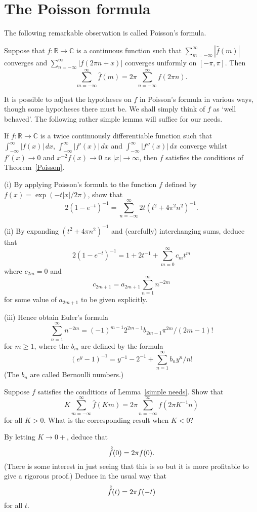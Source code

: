 \section{The Poisson formula}\label{Poisson section}
The following
remarkable observation is called Poisson's formula.
\begin{theorem}\label{Poisson}
Suppose that
$f:{\mathbb R}\rightarrow{\mathbb C}$ is a continuous
function such that $\sum_{m=-\infty}^{\infty}|\hat{f}(m)|$
converges and $\sum_{n=-\infty}^{\infty}|f(2\pi n+x)|$
converges uniformly on $[-\pi,\pi]$. Then
\[\sum_{m=-\infty}^{\infty}\hat{f}(m)=
2\pi\sum_{n=-\infty}^{\infty}f(2\pi n).\]
\end{theorem}

It is possible to adjust the hypotheses on $f$
in Poisson's formula in various ways,
though some hypotheses there must be. We shall simply
think of $f$ as `well behaved'. The following
rather simple lemma will suffice for our needs.
\begin{lemma}\label{simple needs}
If $f:{\mathbb R}\rightarrow{\mathbb C}$
is a twice continuously differentiable function such
that $\int_{-\infty}^{\infty}|f(x)|\,dx$,
$\int_{-\infty}^{\infty}|f'(x)|\,dx$
and $\int_{-\infty}^{\infty}|f''(x)|\,dx$
converge whilst $f'(x)\rightarrow 0$
and $x^{-2}f(x)\rightarrow 0$ as $|x|\rightarrow\infty$,
then $f$ satisfies the conditions of Theorem~\ref{Poisson}.
\end{lemma}

\begin{exercise} (i) By applying Poisson's formula to the function
$f$ defined by $f(x)=\exp(-t|x|/2\pi)$, show that
\[2(1-e^{-t})^{-1}
=\sum_{n=-\infty}^{\infty}2t(t^{2}+4\pi^{2}n^{2})^{-1}.\]

(ii) By expanding $(t^{2}+4\pi n^{2})^{-1}$ and
(carefully) interchanging sums, deduce that
\[2(1-e^{-t})^{-1}=1+2t^{-1}+\sum_{m=0}^{\infty}c_{m}t^{m}\]
where $c_{2m}=0$ and
\[c_{2m+1}=a_{2m+1}\sum_{n=1}^{\infty}n^{-2m}\]
for some value of $a_{2m+1}$ to be given explicitly.

(iii) Hence obtain Euler's formula
\[\sum_{n=1}^{\infty}n^{-2m}=
(-1)^{m-1}2^{2m-1}b_{2m-1}\pi^{2m}/(2m-1)!\]
for $m\geq 1$, where the $b_{m}$ are defined by the formula
\[(e^{y}-1)^{-1}=y^{-1}-2^{-1}+\sum_{n=1}^{\infty}b_{n}y^{n}/n!\]
(The $b_{n}$ are called Bernoulli numbers.)
\end{exercise}
\begin{exercise} Suppose $f$ satisfies the conditions of
Lemma~\ref{simple needs}. Show that
\[K\sum_{m=-\infty}^{\infty}\hat{f}(Km)=
2\pi \sum_{n=-\infty}^{\infty}f(2\pi K^{-1}n)\]
for all $K>0$. What is the corresponding result when $K<0$?

By letting $K\rightarrow 0+$, deduce that
\[\Hat{\Hat{f}}(0)=2\pi f(0).\]
(There is some interest in just seeing that this is so
but it is more profitable to give a rigorous proof.)
Deduce in the usual way that
\[\Hat{\Hat{f}}(t)=2\pi f(-t)\]
for all $t$.
\end{exercise}

